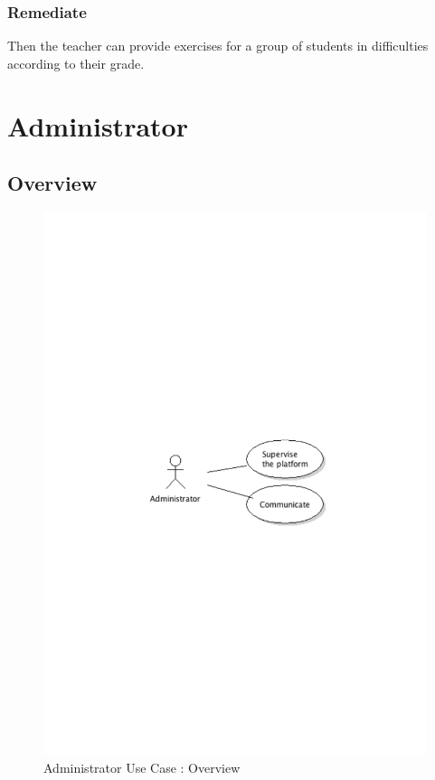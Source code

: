 		\subsubsection{Remediate}
			Then the teacher can provide exercises for a group of students in difficulties according to their grade.
\newpage
\section{Administrator}
	\subsection{Overview}
		\begin{figure}[ht]
			\begin{center}
				\includegraphics[width=\textwidth, trim=2cm 12cm 2cm 12cm]{UML_figure/UC/administrator/UC_Administrator_General.pdf}
				\caption{Administrator Use Case : Overview}
			\end{center}
		\end{figure}
